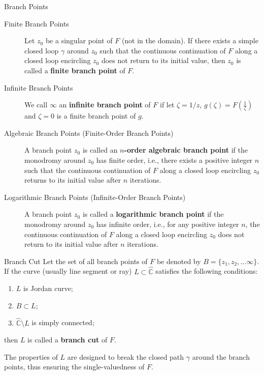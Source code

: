 \begin{definition}{Branch Points} %
    \begin{description}
        \item[Finite Branch Points]
            Let \(z_{0}\) be a singular point of \(F\) (not in the domain).
            If there exists a simple closed loop \(\gamma\) around \(z_{0}\) such that 
            the continuous continuation of \(F\) along a closed loop encircling \(z_0\) 
            does not return to its initial value,
            then \(z_{0}\) is called a \textbf{finite branch point} of \(F\).
        \item[Infinite Branch Points] 
            We call \(\infty\) an \textbf{infinite branch point} of \(F\) if 
            let \(\zeta = 1/z\), \(g(\zeta) = F(\frac{1}{\zeta})\) and \(\zeta=0\) is a finite branch point of \(g\).
        \item[Algebraic Branch Points (Finite-Order Branch Points)]
            A branch point \(z_0\) is called an \textbf{\(n\)-order algebraic branch point} if 
            the monodromy around \(z_0\) has finite order, i.e., there exists a positive integer \(n\) such that 
            the continuous continuation of \(F\) along a closed loop encircling \(z_0\) 
            returns to its initial value after \(n\) iterations.
        \item[Logarithmic Branch Points (Infinite-Order Branch Points)]  
            A branch point \(z_0\) is called a \textbf{logarithmic branch point} if 
            the monodromy around \(z_0\) has infinite order, i.e., for any positive integer \(n\), 
            the continuous continuation of \(F\) along a closed loop encircling \(z_0\) 
            does not return to its initial value after \(n\) iterations.
    \end{description}
\end{definition}

\begin{definition}{Branch Cut}
    Let the set of all branch points of \(F\) be denoted by \(B = \{ z_1, z_2, \ldots \infty \}\).
    If the curve (usually line segment or ray) \(L \subset \mathbb{\hat{C}}\) satisfies the following conditions:
    \begin{enumerate}
        \item \(L\) is Jordan curve;
        \item \(B \subset L\);
        \item \(\mathbb{\hat{C}} \setminus L\) is simply connected;
    \end{enumerate}
    then \(L\) is called a \textbf{branch cut} of \(F\).
\end{definition}
The properties of \(L\) are designed to break the closed path \(\gamma\) around the branch points, 
thus ensuring the single-valuedness of \(F\).

